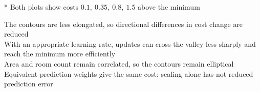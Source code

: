 \documentclass[10pt,a4paper]{article}
\newif\ifanswers\answerstrue
\newcommand{\note}[1]{\par\hspace*{7mm}\begin{minipage}{\dimexpr\linewidth-7mm}\fontsize{7.5}{10.5}\selectfont\color{muted}* #1\end{minipage}\par}
\newcommand{\solution}[2]{\par\vspace{1.5mm}\begin{minipage}[t][#1][t]{\linewidth}\vspace{0pt}\fontsize{8}{11}\selectfont\ifanswers\leavevmode\color{answerred}#2\else{\color{grid}\hrule height .3pt}\fi\end{minipage}\par}
\begin{document}
\note{Both plots show costs $0.1,\ 0.35,\ 0.8,\ 1.5$ above the minimum}
\solution{32mm}{The contours are less elongated, so directional differences in cost change are reduced\\With an appropriate learning rate, updates can cross the valley less sharply and reach the minimum more efficiently\\Area and room count remain correlated, so the contours remain elliptical\\Equivalent prediction weights give the same cost; scaling alone has not reduced prediction error}
\end{document}
